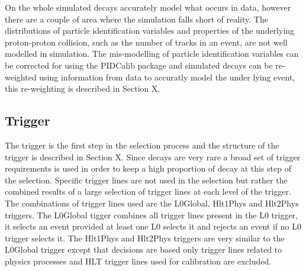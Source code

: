 On the whole simulated decays accurately model what occurs in data, however there are a couple of area where the simulation falls short of reality.
The distributions of particle identification variables and properties of the underlying proton-proton collision, such as the number of tracks in an event, are not well modelled in simulation. %
The mis-modelling of particle identification variables can be corrected for using the PIDCalib package and simulated decays can be re-weighted using information from data to accuratly model the under lying event, this re-weighting is described in Section X. 


\subsection{Trigger}
\label{sec:triggerRequirements}

The trigger is the first step in the selection process and the structure of the trigger is described in Section X. Since \bsmumu decays are very rare a broad set of trigger requirements is used in order to keep a high proportion of \bsmumu decay at this step of the selection. Specific trigger lines are not used in the selection but rather the combined results of a large selection of trigger lines at each level of the trigger. The combinations of trigger lines used are the L0Global, Hlt1Phys and Hlt2Phys triggers. The L0Global tigger combines all trigger lines present in the L0 trigger, it selects an event provided at least one L0 selects it and rejects an event if no L0 trigger selects it. The Hlt1Phys and Hlt2Phys triggers are very similar to the L0Global trigger except that decisions are based only trigger lines related to physics processes and HLT trigger lines used for calibration are excluded. 

